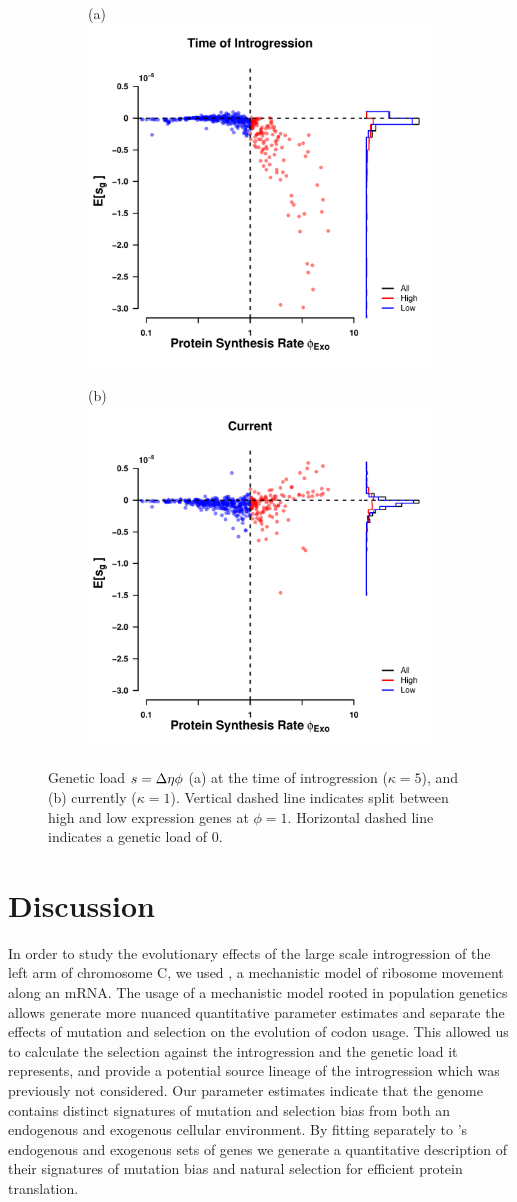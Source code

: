 \documentclass[fleqn,letterpaper]{article}
\begin{document}
\begin{figure}
    \centering
    \begin{subfigure}
        \centering
        (a) \includegraphics[width=.45\textwidth]{img/fitness_difference_gos_kappa5.pdf}
    \end{subfigure}
    \begin{subfigure}
        \centering
        (b) \includegraphics[width=.45\textwidth]{img/fitness_difference_exo.pdf}
    \end{subfigure}
    \caption{Genetic load $s = {\Delta \eta} \phi$ (a) at the time of introgression ($\kappa = 5$), and (b) currently ($\kappa = 1$). 
        Vertical dashed line indicates split between high and low expression genes at $\phi = 1$.
    	Horizontal dashed line indicates a genetic load of 0.}
    \label{fig:sne_fitness_burden}
\end{figure}


\section*{Discussion}

In order to study the evolutionary effects of the large scale introgression of the left arm of chromosome C, we used \ROC, a mechanistic model of ribosome movement along an mRNA.
The usage of a mechanistic model rooted in population genetics allows generate more nuanced quantitative parameter estimates and separate the effects of mutation and selection on the evolution of codon usage.
This allowed us to calculate the selection against the introgression and the genetic load it represents, and provide a potential source lineage of the introgression which was previously not considered.
Our parameter estimates indicate that the \kluyveri genome contains distinct signatures of mutation and selection bias from both an endogenous and exogenous cellular environment.
By fitting \ROC separately to \kluyveri's endogenous and exogenous sets of genes we generate a quantitative description of their signatures of mutation bias and natural selection for efficient protein translation.
\end{document}
